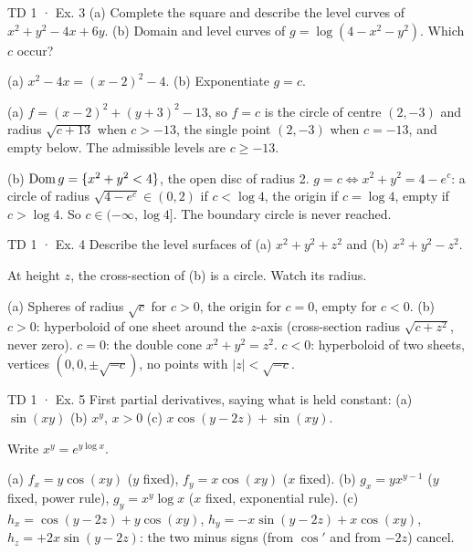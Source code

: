 \begin{problem}{TD 1 · Ex. 3}
(a) Complete the square and describe the level curves of $x^2+y^2-4x+6y$.
(b) Domain and level curves of $g=\log(4-x^2-y^2)$. Which $c$ occur?
\end{problem}
\begin{hint}(a) $x^2-4x=(x-2)^2-4$. (b) Exponentiate $g=c$.\end{hint}
\begin{solution}
(a) $f=(x-2)^2+(y+3)^2-13$, so $f=c$ is the circle of centre $(2,-3)$ and radius
$\sqrt{c+13}$ when $c>-13$, the single point $(2,-3)$ when $c=-13$, and empty below. The
admissible levels are $c\ge-13$.

(b) $\operatorname{Dom} g=\{x^2+y^2<4\}$, the open disc of radius 2. $g=c\iff x^2+y^2=4-e^c$: a circle of
radius $\sqrt{4-e^c}\in(0,2)$ if $c<\log 4$, the origin if $c=\log4$, empty if $c>\log4$. So
$c\in(-\infty,\log 4]$. The boundary circle is never reached.
\end{solution}

\begin{problem}{TD 1 · Ex. 4}
Describe the level surfaces of (a) $x^2+y^2+z^2$ and (b) $x^2+y^2-z^2$.
\end{problem}
\begin{hint}At height $z$, the cross-section of (b) is a circle. Watch its radius.\end{hint}
\begin{solution}
(a) Spheres of radius $\sqrt c$ for $c>0$, the origin for $c=0$, empty for $c<0$.
(b) $c>0$: hyperboloid of one sheet around the $z$-axis (cross-section radius
$\sqrt{c+z^2}$, never zero). $c=0$: the double cone $x^2+y^2=z^2$. $c<0$: hyperboloid of two
sheets, vertices $(0,0,\pm\sqrt{-c})$, no points with $|z|<\sqrt{-c}$.
\end{solution}

\begin{problem}{TD 1 · Ex. 5}
First partial derivatives, saying what is held constant:
(a) $\sin(xy)$ \quad (b) $x^y$, $x>0$ \quad (c) $x\cos(y-2z)+\sin(xy)$.
\end{problem}
\begin{hint}Write $x^y=e^{y\log x}$.\end{hint}
\begin{solution}
(a) $f_x=y\cos(xy)$ ($y$ fixed), $f_y=x\cos(xy)$ ($x$ fixed).
(b) $g_x=yx^{y-1}$ ($y$ fixed, power rule), $g_y=x^y\log x$ ($x$ fixed, exponential rule).
(c) $h_x=\cos(y-2z)+y\cos(xy)$, $h_y=-x\sin(y-2z)+x\cos(xy)$,
$h_z=+2x\sin(y-2z)$: the two minus signs (from $\cos'$ and from $-2z$) cancel.
\end{solution}

